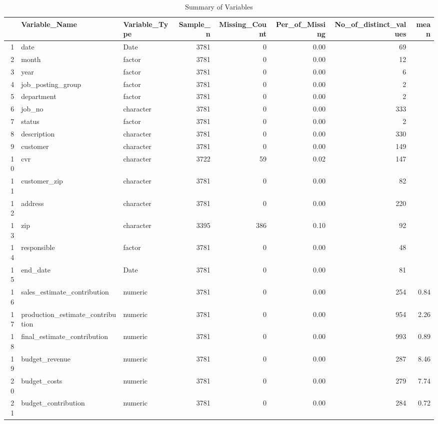 \begin{sidewaystable}[ht]
\centering
\caption{Summary of Variables} 
\begin{tabular}{rllrrrrr}
  \hline
 & Variable\_Name & Variable\_Type & Sample\_n & Missing\_Count & Per\_of\_Missing & No\_of\_distinct\_values & mean \\ 
  \hline
1 & date & Date & 3781 &   0 & 0.00 &  69 &  \\ 
  2 & month & factor & 3781 &   0 & 0.00 &  12 &  \\ 
  3 & year & factor & 3781 &   0 & 0.00 &   6 &  \\ 
  4 & job\_posting\_group & factor & 3781 &   0 & 0.00 &   2 &  \\ 
  5 & department & factor & 3781 &   0 & 0.00 &   2 &  \\ 
  6 & job\_no & character & 3781 &   0 & 0.00 & 333 &  \\ 
  7 & status & factor & 3781 &   0 & 0.00 &   2 &  \\ 
  8 & description & character & 3781 &   0 & 0.00 & 330 &  \\ 
  9 & customer & character & 3781 &   0 & 0.00 & 149 &  \\ 
  10 & cvr & character & 3722 &  59 & 0.02 & 147 &  \\ 
  11 & customer\_zip & character & 3781 &   0 & 0.00 &  82 &  \\ 
  12 & address & character & 3781 &   0 & 0.00 & 220 &  \\ 
  13 & zip & character & 3395 & 386 & 0.10 &  92 &  \\ 
  14 & responsible & factor & 3781 &   0 & 0.00 &  48 &  \\ 
  15 & end\_date & Date & 3781 &   0 & 0.00 &  81 &  \\ 
  16 & sales\_estimate\_contribution & numeric & 3781 &   0 & 0.00 & 254 & 0.84 \\ 
  17 & production\_estimate\_contribution & numeric & 3781 &   0 & 0.00 & 954 & 2.26 \\ 
  18 & final\_estimate\_contribution & numeric & 3781 &   0 & 0.00 & 993 & 0.89 \\ 
  19 & budget\_revenue & numeric & 3781 &   0 & 0.00 & 287 & 8.46 \\ 
  20 & budget\_costs & numeric & 3781 &   0 & 0.00 & 279 & 7.74 \\ 
  21 & budget\_contribution & numeric & 3781 &   0 & 0.00 & 284 & 0.72 \\ 

\end{tabular}
\end{sidewaystable}
